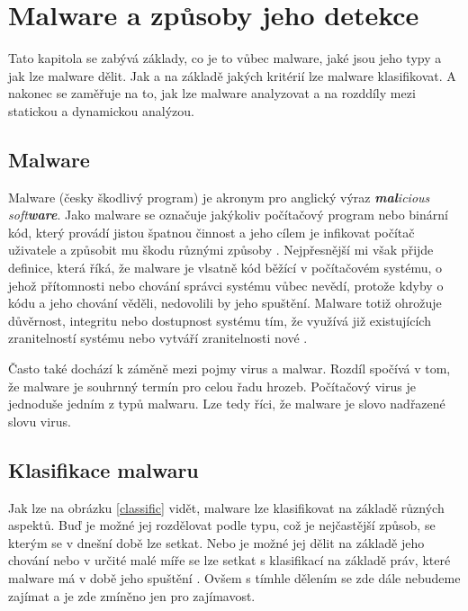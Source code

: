 \chapter{Malware a způsoby jeho detekce} \label{2.chap}

Tato kapitola se zabývá základy, co je to vůbec malware, jaké jsou jeho typy a jak lze malware dělit. Jak a na základě jakých kritérií lze malware klasifikovat.
A nakonec se zaměřuje na to, jak lze malware analyzovat a na rozddíly mezi statickou a dynamickou analýzou. 


\section{Malware}
Malware (česky škodlivý program) je akronym pro anglický výraz \textit{\textbf{mal}icious soft\textbf{ware}}. Jako malware se označuje jakýkoliv počítačový program nebo binární kód, který provádí jistou 
špatnou činnost a jeho cílem je infikovat počítač uživatele a způsobit mu škodu různými způsoby \cite{malware_book}. %
Nejpřesnější mi však přijde definice, která říká, že malware je vlsatně kód běžící v počítačovém systému, o jehož přítomnosti nebo chování správci systému vůbec nevědí, protože kdyby o kódu a jeho chování věděli, nedovolili by jeho spuštění.
Malware totiž ohrožuje důvěrnost, integritu nebo dostupnost systému tím, že využívá již existujících zranitelností systému nebo vytváří zranitelnosti nové \cite{article_malware}.%

Často také dochází k záměně mezi pojmy virus a malwar. Rozdíl spočívá v tom, že malware je souhrnný termín pro celou řadu hrozeb. Počítačový virus je jednoduše jedním z typů malwaru. Lze tedy říci, že malware je slovo nadřazené slovu virus.

\section{Klasifikace malwaru}
Jak lze na obrázku \ref{classific} vidět, malware lze klasifikovat na základě různých aspektů. Buď je možné jej rozdělovat podle typu, což je nejčastější způsob, se kterým se v dnešní době lze setkat. Nebo je možné 
jej dělit na základě jeho chování nebo v určité malé míře se lze setkat s klasifikací na základě práv, které malware má v době jeho spuštění \cite{article_malware}. Ovšem s tímhle dělením se zde dále nebudeme zajímat a je zde zmíněno jen pro zajímavost.


